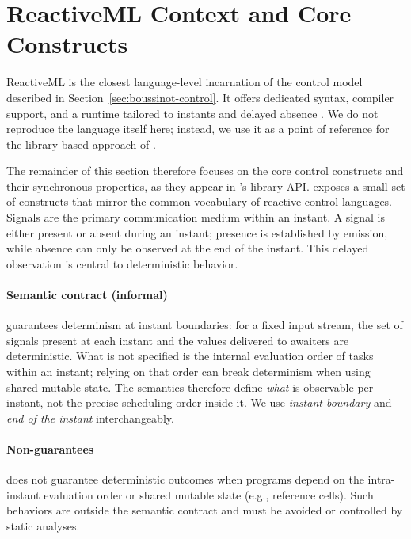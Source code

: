 \section{ReactiveML Context and Core Constructs}
ReactiveML is the closest language-level incarnation of the control model
described in Section~\ref{sec:boussinot-control}. It offers dedicated syntax,
compiler support, and a runtime tailored to instants and delayed absence
\cite{reactiveml2005}. We do not reproduce the language itself here; instead,
we use it as a point of reference for the library-based approach of \tempo{}.

The remainder of this section therefore focuses on the core control constructs
and their synchronous properties, as they appear in \tempo{}'s library API.
\tempo{} exposes a small set of constructs that mirror the common vocabulary of
reactive control languages. Signals are the primary communication medium within
an instant. A signal is either present or absent during an instant; presence is
established by emission, while absence can only be observed at the end of the
instant. This delayed observation is central to deterministic behavior.

\paragraph{Semantic contract (informal)}
\tempo{} guarantees determinism at instant boundaries: for a fixed input stream,
the set of signals present at each instant and the values delivered to awaiters
are deterministic. What is not specified is the internal evaluation order of
tasks within an instant; relying on that order can break determinism when using
shared mutable state. The semantics therefore define \emph{what} is observable
per instant, not the precise scheduling order inside it.
We use \emph{instant boundary} and \emph{end of the instant} interchangeably.

\paragraph{Non-guarantees}
\tempo{} does not guarantee deterministic outcomes when programs depend on the
intra-instant evaluation order or shared mutable state (e.g., reference cells).
Such behaviors are outside the semantic contract and must be avoided or
controlled by static analyses.

